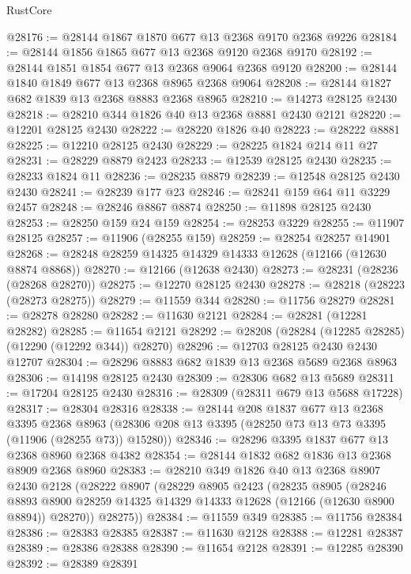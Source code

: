 \begin{lexlean}{RustCore}
\begin{coremodule}
@28176 := @28144 @1867 @1870 @677 @13 @2368 @9170 @2368 @9226
@28184 := @28144 @1856 @1865 @677 @13 @2368 @9120 @2368 @9170
@28192 := @28144 @1851 @1854 @677 @13 @2368 @9064 @2368 @9120
@28200 := @28144 @1840 @1849 @677 @13 @2368 @8965 @2368 @9064
@28208 := @28144 @1827 @682 @1839 @13 @2368 @8883 @2368 @8965
@28210 := @14273 @28125 @2430
@28218 := @28210 @344 @1826 @40 @13 @2368 @8881 @2430 @2121
@28220 := @12201 @28125 @2430
@28222 := @28220 @1826 @40
@28223 := @28222 @8881
@28225 := @12210 @28125 @2430
@28229 := @28225 @1824 @214 @11 @27
@28231 := @28229 @8879 @2423
@28233 := @12539 @28125 @2430
@28235 := @28233 @1824 @11
@28236 := @28235 @8879
@28239 := @12548 @28125 @2430 @2430
@28241 := @28239 @177 @23
@28246 := @28241 @159 @64 @11 @3229 @2457
@28248 := @28246 @8867 @8874
@28250 := @11898 @28125 @2430
@28253 := @28250 @159 @24 @159
@28254 := @28253 @3229
@28255 := @11907 @28125
@28257 := @11906 (@28255 @159)
@28259 := @28254 @28257 @14901
@28268 := @28248 @28259 @14325 @14329 @14333 @12628 (@12166 (@12630 @8874 @8868))
@28270 := @12166 (@12638 @2430)
@28273 := @28231 (@28236 (@28268 @28270))
@28275 := @12270 @28125 @2430
@28278 := @28218 (@28223 (@28273 @28275))
@28279 := @11559 @344
@28280 := @11756 @28279
@28281 := @28278 @28280
@28282 := @11630 @2121
@28284 := @28281 (@12281 @28282)
@28285 := @11654 @2121
@28292 := @28208 (@28284 (@12285 @28285) (@12290 (@12292 @344)) @28270)
@28296 := @12703 @28125 @2430 @2430 @12707
@28304 := @28296 @8883 @682 @1839 @13 @2368 @5689 @2368 @8963
@28306 := @14198 @28125 @2430
@28309 := @28306 @682 @13 @5689
@28311 := @17204 @28125 @2430
@28316 := @28309 (@28311 @679 @13 @5688 @17228)
@28317 := @28304 @28316
@28338 := @28144
    @208
    @1837
    @677
    @13
    @2368
    @3395
    @2368
    @8963
    (@28306 @208 @13 @3395 (@28250 @73 @13 @73 @3395 (@11906 (@28255 @73)) @15280))
@28346 := @28296 @3395 @1837 @677 @13 @2368 @8960 @2368 @4382
@28354 := @28144 @1832 @682 @1836 @13 @2368 @8909 @2368 @8960
@28383 := @28210
    @349
    @1826
    @40
    @13
    @2368
    @8907
    @2430
    @2128
    (@28222
      @8907
      (@28229
        @8905
        @2423
        (@28235
          @8905
          (@28246
            @8893
            @8900
            @28259
            @14325
            @14329
            @14333
            @12628
            (@12166 (@12630 @8900 @8894))
            @28270))
        @28275))
@28384 := @11559 @349
@28385 := @11756 @28384
@28386 := @28383 @28385
@28387 := @11630 @2128
@28388 := @12281 @28387
@28389 := @28386 @28388
@28390 := @11654 @2128
@28391 := @12285 @28390
@28392 := @28389 @28391

\end{coremodule}
\end{lexlean}
